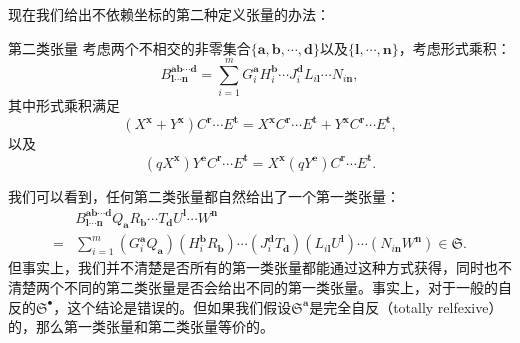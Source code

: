 现在我们给出不依赖坐标的第二种定义张量的办法：

\begin{defi}[label={defi:tensor of second type}]{第二类张量}
	考虑两个不相交的非零集合$\{\boldsymbol{a} ,\boldsymbol{b} ,\cdots ,\boldsymbol{d}\}$以及$\{\boldsymbol{l} ,\cdots ,\boldsymbol{n}\}$，考虑形式乘积：
	\begin{equation}
		B_{\boldsymbol{l} \cdots \boldsymbol{n}}^{\boldsymbol{ab} \cdots \boldsymbol{d}} =\sum _{i=1}^{m} G_{i}^{\boldsymbol{a}} H_{i}^{\boldsymbol{b}} \cdots J_{i}^{\boldsymbol{d}} L_{i\boldsymbol{l}} \cdots N_{i\boldsymbol{n}} ,
		\label{eq:tensor of second type}
	\end{equation}
	其中形式乘积满足
	\begin{equation*}
		(X^{\boldsymbol{x}} +Y^{\boldsymbol{x}} )C^{\boldsymbol{r}} \cdots E^{\boldsymbol{t}} =X^{\boldsymbol{x}} C^{\boldsymbol{r}} \cdots E^{\boldsymbol{t}} +Y^{\boldsymbol{x}} C^{\boldsymbol{r}} \cdots E^{\boldsymbol{t}} ,
	\end{equation*}
	以及
	\begin{equation*}
		(qX^{\boldsymbol{x}} )Y^{\boldsymbol{e}} C^{\boldsymbol{r}} \cdots E^{\boldsymbol{t}} =X^{\boldsymbol{x}} (qY^{\boldsymbol{e}} )C^{\boldsymbol{r}} \cdots E^{\boldsymbol{t}} .
	\end{equation*}
\end{defi}

我们可以看到，任何第二类张量都自然给出了一个第一类张量：
\begin{equation}
	\begin{aligned}
		& B_{\boldsymbol{l} \cdots \boldsymbol{n}}^{\boldsymbol{ab} \cdots \boldsymbol{d}} Q_{\boldsymbol{a}} R_{\boldsymbol{b}} \cdots T_{\boldsymbol{d}} U^{\boldsymbol{l}} \cdots W^{\boldsymbol{n}}\\
		= & \sum _{i=1}^{m} (G_{i}^{\boldsymbol{a}} Q_{\boldsymbol{a}} )(H_{i}^{\boldsymbol{b}} R_{\boldsymbol{b}} )\cdots (J_{i}^{\boldsymbol{d}} T_{\boldsymbol{d}} )(L_{i\boldsymbol{l}} U^{\boldsymbol{l}} )\cdots (N_{i\boldsymbol{n}} W^{\boldsymbol{n}} )\in \mathfrak{S} .
	\end{aligned}
	\label{eq:second type to first type}
\end{equation}
但事实上，我们并不清楚是否所有的第一类张量都能通过这种方式获得，同时也不清楚两个不同的第二类张量是否会给出不同的第一类张量。事实上，对于一般的自反的$\mathfrak{S}^{\bullet }$，这个结论是错误的。但如果我们假设$\mathfrak{S}^{\boldsymbol{a}}$是完全自反（totally relfexive）的，那么第一类张量和第二类张量等价的。


